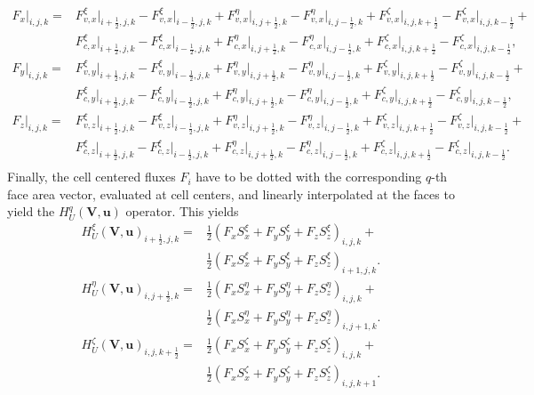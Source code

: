 \begin{align}
	F_x\bigg|_{i,j,k} = 
	&F^\xi_{v,x}\bigg|_{i+\frac{1}{2},j,k} - F^\xi_{v,x}\bigg|_{i-\frac{1}{2},j,k} + 
	F^\eta_{v,x}\bigg|_{i,j+\frac{1}{2},k} - F^\eta_{v,x}\bigg|_{i,j-\frac{1}{2},k} + 
	F^\zeta_{v,x}\bigg|_{i,j,k+\frac{1}{2}} - F^\zeta_{v,x}\bigg|_{i,j,k-\frac{1}{2}} +
	\nonumber \\
	&F^\xi_{c,x}\bigg|_{i+\frac{1}{2},j,k} - F^\xi_{c,x}\bigg|_{i-\frac{1}{2},j,k} + 
	F^\eta_{c,x}\bigg|_{i,j+\frac{1}{2},k} - F^\eta_{c,x}\bigg|_{i,j-\frac{1}{2},k} + 
	F^\zeta_{c,x}\bigg|_{i,j,k+\frac{1}{2}} - F^\zeta_{c,x}\bigg|_{i,j,k-\frac{1}{2}}, \nonumber \\
	F_y\bigg|_{i,j,k} = 
	&F^\xi_{v,y}\bigg|_{i+\frac{1}{2},j,k} - F^\xi_{v,y}\bigg|_{i-\frac{1}{2},j,k} + 
	F^\eta_{v,y}\bigg|_{i,j+\frac{1}{2},k} - F^\eta_{v,y}\bigg|_{i,j-\frac{1}{2},k} + 
	F^\zeta_{v,y}\bigg|_{i,j,k+\frac{1}{2}} - F^\zeta_{v,y}\bigg|_{i,j,k-\frac{1}{2}} +
	\nonumber \\
	&F^\xi_{c,y}\bigg|_{i+\frac{1}{2},j,k} - F^\xi_{c,y}\bigg|_{i-\frac{1}{2},j,k} + 
	F^\eta_{c,y}\bigg|_{i,j+\frac{1}{2},k} - F^\eta_{c,y}\bigg|_{i,j-\frac{1}{2},k} + 
	F^\zeta_{c,y}\bigg|_{i,j,k+\frac{1}{2}} - F^\zeta_{c,y}\bigg|_{i,j,k-\frac{1}{2}}, \nonumber \\
	F_z\bigg|_{i,j,k} = 
	&F^\xi_{v,z}\bigg|_{i+\frac{1}{2},j,k} - F^\xi_{v,z}\bigg|_{i-\frac{1}{2},j,k} + 
	F^\eta_{v,z}\bigg|_{i,j+\frac{1}{2},k} - F^\eta_{v,z}\bigg|_{i,j-\frac{1}{2},k} + 
	F^\zeta_{v,z}\bigg|_{i,j,k+\frac{1}{2}} - F^\zeta_{v,z}\bigg|_{i,j,k-\frac{1}{2}} +
	\nonumber \\
	&F^\xi_{c,z}\bigg|_{i+\frac{1}{2},j,k} - F^\xi_{c,z}\bigg|_{i-\frac{1}{2},j,k} + 
	F^\eta_{c,z}\bigg|_{i,j+\frac{1}{2},k} - F^\eta_{c,z}\bigg|_{i,j-\frac{1}{2},k} + 
	F^\zeta_{c,z}\bigg|_{i,j,k+\frac{1}{2}} - F^\zeta_{c,z}\bigg|_{i,j,k-\frac{1}{2}}. \nonumber \\
\end{align}
Finally, the cell centered fluxes $F_i$ have to be dotted with the corresponding $q$-th face area vector, evaluated at cell centers, and linearly interpolated at the faces to yield the $H^q_U(\mathbf{V},\mathbf{u})$ operator. This yields 
\begin{align}
	H^\xi_U(\mathbf{V},\mathbf{u})_{i+\frac{1}{2},j,k} = 
	&\frac{1}{2}\left(F_x S^\xi_x + F_y S^\xi_y + F_z S^\xi_z\right)_{i,j,k} + \nonumber \\
	&\frac{1}{2}\left(F_x S^\xi_x + F_y S^\xi_y + F_z S^\xi_z\right)_{i+1,j,k}. \label{eq:advectionViscousOperatorCsi} \\
	H^\eta_U(\mathbf{V},\mathbf{u})_{i,j+\frac{1}{2},k} = 
	&\frac{1}{2}\left(F_x S^\eta_x + F_y S^\eta_y + F_z S^\eta_z\right)_{i,j,k} + \nonumber \\
	&\frac{1}{2}\left(F_x S^\eta_x + F_y S^\eta_y + F_z S^\eta_z\right)_{i,j+1,k}. \label{eq:advectionViscousOperatorEta} \\
	H^\zeta_U(\mathbf{V},\mathbf{u})_{i,j,k+\frac{1}{2}} = 
	&\frac{1}{2}\left(F_x S^\zeta_x + F_y S^\zeta_y + F_z S^\zeta_z\right)_{i,j,k} + \nonumber \\
	&\frac{1}{2}\left(F_x S^\zeta_x + F_y S^\zeta_y + F_z S^\zeta_z\right)_{i,j,k+1}. \label{eq:advectionViscousOperatorZet} 
\end{align}

